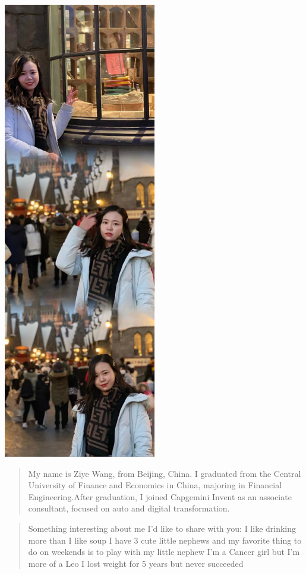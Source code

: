 \documentclass[
]{book}
\begin{document}
\includegraphics[width=0.5\textwidth,height=\textheight]{Images/Siye.jpg}

\begin{quote}
My name is Ziye Wang, from Beijing, China. I graduated from the Central University of Finance and Economics in China, majoring in Financial Engineering.After graduation, I joined Capgemini Invent as an associate consultant, focused on auto and digital transformation.
\end{quote}

\begin{quote}
Something interesting about me I'd like to share with you:
I like drinking more than I like soup
I have 3 cute little nephews and my favorite thing to do on weekends is to play with my little nephew
I'm a Cancer girl but I'm more of a Leo
I lost weight for 5 years but never succeeded
\end{quote}
\end{document}
